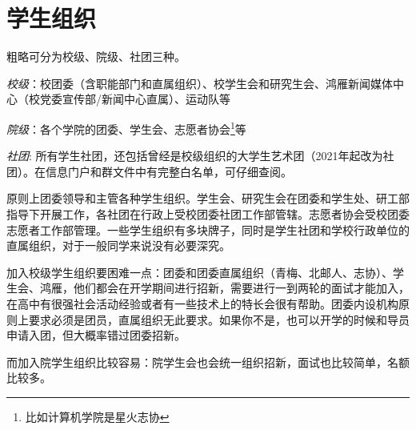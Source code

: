 \section{学生组织}


粗略可分为校级、院级、社团三种。

\emph{校级}：校团委（含职能部门和直属组织）、校学生会和研究生会、鸿雁新闻媒体中心（校党委宣传部/新闻中心直属）、运动队等


\emph{院级}：各个学院的团委、学生会、志愿者协会\footnote{比如计算机学院是星火志协}等

\emph{社团}: 所有学生社团，还包括曾经是校级组织的大学生艺术团（2021年起改为社团）。在信息门户和群文件中有完整白名单，可仔细查阅。

原则上团委领导和主管各种学生组织。学生会、研究生会在团委和学生处、研工部指导下开展工作，各社团在行政上受校团委社团工作部管辖。志愿者协会受校团委志愿者工作部管理。一些学生组织有多块牌子，同时是学生社团和学校行政单位的直属组织，对于一般同学来说没有必要深究。




加入校级学生组织要困难一点：团委和团委直属组织（青梅、北邮人、志协）、学生会、鸿雁，他们都会在开学期间进行招新，需要进行一到两轮的面试才能加入，在高中有很强社会活动经验或者有一些技术上的特长会很有帮助。团委内设机构原则上要求必须是团员，直属组织无此要求。如果你不是，也可以开学的时候和导员申请入团，但大概率错过团委招新。

而加入院学生组织比较容易：院学生会也会统一组织招新，面试也比较简单，名额比较多。

